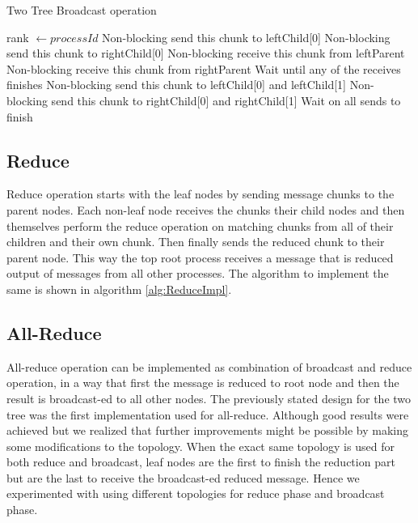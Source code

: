 \documentclass[sigplan,review,anonymous]{acmart}\settopmatter{printfolios=true,printccs=false,printacmref=false}
\begin{document}
\begin{algorithm}
  \scriptsize
\caption{Two Tree Broadcast operation}\label{alg:broadcastImpl}
\begin{algorithmic}[1]
\REQUIRE rank $\leftarrow processId$ 
            \STATE Non-blocking send this chunk to leftChild[0]
        \ELSE
            \STATE Non-blocking send this chunk to rightChild[0]
        \ENDIF
    \ENDFOR
{}
            \STATE Non-blocking receive this chunk from leftParent
            \STATE Non-blocking receive this chunk from rightParent
        \ENDIF
    \ENDFOR
        \STATE Wait until any of the receives finishes
            \STATE Non-blocking send this chunk to leftChild[0] and leftChild[1]
            \STATE Non-blocking send this chunk to rightChild[0] and rightChild[1]
        \ENDIF
    \ENDWHILE
\ENDIF
\STATE Wait on all sends to finish
\end{algorithmic}
\end{algorithm}

\subsection{Reduce}
Reduce operation starts with the leaf nodes by sending message chunks to the parent nodes. Each non-leaf node receives the chunks their child nodes and then themselves perform the reduce operation on matching chunks from all of their children and their own chunk. Then finally sends the reduced chunk to their parent node. This way the top root process receives a message that is reduced output of messages from all other processes. The algorithm to implement the same is shown in algorithm \ref{alg:ReduceImpl}.

\subsection{All-Reduce}
All-reduce operation can be implemented as combination of broadcast and reduce operation, in a way that first the message is reduced to root node and then the result is broadcast-ed to all other nodes. The previously stated design for the two tree was the first implementation used for all-reduce. Although good results were achieved but we realized that further improvements might be possible by making some modifications to the topology. When the exact same topology is used for both reduce and broadcast, leaf nodes are the first to finish the reduction part but are the last to receive the broadcast-ed reduced message. Hence we experimented with using different topologies for reduce phase and broadcast phase.
\end{document}
